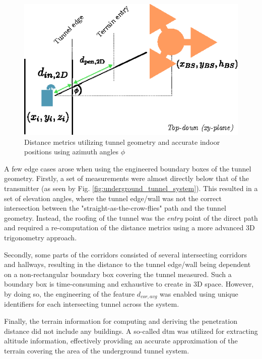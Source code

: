 \begin{figure}
    \centering
    \includegraphics{chapters/part_pathloss/figures/outdoor_to_indoor/inside_distance_illustration_xyplane.eps}
    \caption{Distance metrics utilizing tunnel geometry and accurate indoor positions using azimuth angles $\phi$}
    \label{fig:inside_distance_xy}
\end{figure}

\noindent A few edge cases arose when using the engineered boundary boxes of the tunnel geometry. Firstly, a set of measurements were almost directly below that of the transmitter (as seen by Fig. \ref{fig:underground_tunnel_system}). This resulted in a set of elevation angles, where the tunnel edge/wall was not the correct intersection between the "straight-as-the-crow-flies" path and the tunnel geometry. Instead, the roofing of the tunnel was the \emph{entry} point of the direct path and required a re-computation of the distance metrics using a more advanced $3$D trigonometry approach. 

Secondly, some parts of the corridors consisted of several intersecting corridors and hallways, resulting in the distance to the tunnel edge/wall being dependent on a non-rectangular boundary box covering the tunnel measured. Such a boundary box is time-consuming and exhaustive to create in $3$D space. However, by doing so, the engineering of the feature $d_{cor,avg}$ was enabled using unique identifiers for each intersecting tunnel across the system.

Finally, the terrain information for computing and deriving the penetration distance did not include any buildings. A so-called \gls{dtm} \cite{kortforsyningen} was utilized for extracting altitude information, effectively providing an accurate approximation of the terrain covering the area of the underground tunnel system.


